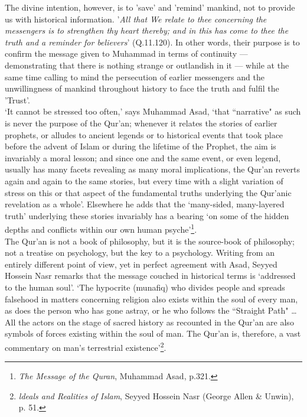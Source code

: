 \documentclass[10pt, twoside]{book}
\begin{document}
The divine intention, however, is to 'save' and 'remind' mankind, not to provide us with historical 
information. '\emph{All that We relate to thee concerning the messengers is to strengthen thy heart 
thereby; and in this has come to thee the truth and a reminder for believers}' (Q.11.120). In other 
words, their purpose is to confirm the message given to Muhammad in terms of continuity --- 
demonstrating that there is nothing strange or outlandish in it --- while at the same time calling to 
mind the persecution of earlier messengers and the unwillingness of mankind throughout history to 
face the truth and fulfil the 'Trust'. \\

`It cannot be stressed too often,' says Muhammad Asad, `that ``narrative" as such is never the purpose 
of the Qur'an; whenever it relates the stories of earlier prophets, or alludes to ancient legends or 
to historical events that took place before the advent of Islam or during the lifetime of the 
Prophet, the aim is invariably a moral lesson; and since one and the same event, or even legend, 
usually has many facets revealing as many moral implications, the Qur'an reverts again and again to 
the same stories, but every time with a slight variation of stress on this or that aspect of the 
fundamental truths underlying the Qur'anic revelation as a whole'. Elsewhere he adds that the 
`many\hyp{}sided, many\hyp{}layered truth' underlying these stories invariably has a bearing `on some of the hidden depths and conflicts within our own human psyche'\footnote{\emph{The Message of the Quran}, Muhammad Asad, p.321.}.\\

The Qur'an is not a book of philosophy, but it is the source\hyp{}book of philosophy; not a treatise on 
psychology, but the key to a psychology. Writing from an entirely different point of view, yet in 
perfect agreement with Asad, Seyyed Hossein Nasr remarks that the message couched in historical terms 
is `addressed to the human soul'. `The hypocrite (munafiq) who divides people and spreads falsehood 
in matters concerning religion also exists within the soul of every man, as does the person who has 
gone astray, or he who follows the ``Straight Path" \ldots{} All the actors on the stage of sacred history 
as recounted in the Qur'an are also symbols of forces existing within the soul of man. The Qur'an is, 
therefore, a vast commentary on man's terrestrial existence'\footnote{\emph{ldeals and Realities of Islam}, Seyyed Hossein Nasr (George Allen \& Unwin), p. 51.}.\\
\end{document}
